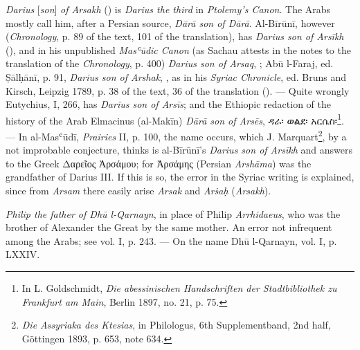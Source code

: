 \documentclass[11pt]{article}
\newcommand{\Pg}[1]{\marginpar{\footnotesize\color{gray}#1}}
\begin{document}
\par \Pg{II 194}\emph{Darius} [\emph{son}] \emph{of Arsakh} () is \emph{Darius the third} in \emph{Ptolemy's Canon}. The Arabs mostly call him, after a Persian source, \emph{Dārā son of Dārā}. Al-Bīrūnī, however (\emph{Chronology}, p. 89 of the text, 101 of the translation), has \emph{Darius son of Arsīkh} (), and in his unpublished \emph{Masʿūdic Canon} (as Sachau attests in the notes to the translation of the \emph{Chronology}, p. 400) \emph{Darius son of Arsaq}, ; Abū l-Faraj, ed. Ṣālḥānī, p. 91, \emph{Darius son of Arshak}, , as in his \emph{Syriac Chronicle}, ed. Bruns and Kirsch, Leipzig 1789, p. 38 of the text, 36 of the translation (). — Quite wrongly Eutychius, I, 266, has \emph{Darius son of Arsīs}; and the Ethiopic redaction of the history of the Arab Elmacinus (al-Makīn) \emph{Dārā son of Arsēs}, {\EthiopicFont ዳራ፡ ወልደ፡ አርሴስ፡}\footnote{In L. Goldschmidt, \emph{Die abessinischen Handschriften der Stadtbibliothek zu Frankfurt am Main}, Berlin 1897, no. 21, p. 75.}. — In al-Masʿūdī, \emph{Prairies} II, p. 100, the name  occurs, which J. Marquart\footnote{\emph{Die Assyriaka des Ktesias}, in Philologus, 6th Supplementband, 2nd half, Göttingen 1893, p. 653, note 634.}, by a not improbable conjecture, thinks is al-Bīrūnī's \emph{Darius son of Arsīkh} and answers to the Greek {\greekfont Δαρεῖος Ἀρσάμου}; for {\greekfont Ἀρσάμης} (Persian \emph{Arshāma}) was the grandfather of Darius III. If this is so, the error in the Syriac writing is explained, since from  \emph{Arsam} there easily arise  \emph{Arsak} and  \emph{Arṡaḥ} (\emph{Arsakh}).\par
\par \emph{Philip the father of Dhū l-Qarnayn}, in place of Philip \emph{Arrhidaeus}, who was the brother of Alexander the Great by the same mother. An error not infrequent among the Arabs; see vol. I, p. 243. — On the name Dhū l-Qarnayn, vol. I, p. LXXIV.\par
\end{document}
